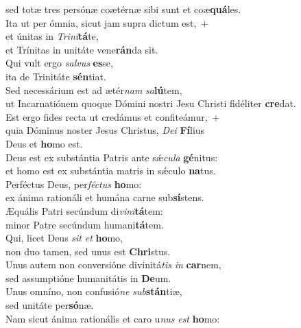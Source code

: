 \evenverse sed totæ tres persónæ coætérnæ sibi sunt et coæ\textbf{quá}les.\\
\oddverse Ita ut per ómnia, sicut jam supra dictum est,~+\\
\oddverse  et únitas in \textit{Tri}\textit{ni}\textbf{tá}te,~\*\\
\oddverse et Trínitas in unitáte vene\textbf{rán}da sit.\\
\evenverse Qui vult ergo \textit{sal}\textit{vus} \textbf{es}se,~\*\\
\evenverse ita de Trinitáte \textbf{sén}tiat.\\
\oddverse Sed necessárium est ad ætér\textit{nam} \textit{sa}\textbf{lú}tem,~\*\\
\oddverse ut Incarnatiónem quoque Dómini nostri Jesu Christi fidéliter \textbf{cre}dat.\\
\evenverse Est ergo fides recta ut credámus et confiteámur,~+\\
\evenverse  quia Dóminus noster Jesus Christus, \textit{De}\textit{i} \textbf{Fí}lius~\*\\
\evenverse Deus et \textbf{ho}mo est.\\
\oddverse Deus est ex substántia Patris ante sǽ\textit{cu}\textit{la} \textbf{gé}nitus:~\*\\
\oddverse et homo est ex substántia matris in sǽculo \textbf{na}tus.\\
\evenverse Perféctus Deus, per\textit{fé}\textit{ctus} \textbf{ho}mo:~\*\\
\evenverse ex ánima rationáli et humána carne sub\textbf{sí}stens.\\
\oddverse Æquális Patri secúndum di\textit{vi}\textit{ni}\textbf{tá}tem:~\*\\
\oddverse minor Patre secúndum humani\textbf{tá}tem.\\
\evenverse Qui, licet Deus \textit{sit} \textit{et} \textbf{ho}mo,~\*\\
\evenverse non duo tamen, sed unus est \textbf{Chri}stus.\\
\oddverse Unus autem non conversióne divinitá\textit{tis} \textit{in} \textbf{car}nem,~\*\\
\oddverse sed assumptióne humanitátis in \textbf{De}um.\\
\evenverse Unus omníno, non confusió\textit{ne} \textit{sub}\textbf{stán}tiæ,~\*\\
\evenverse sed unitáte per\textbf{só}næ.\\
\oddverse Nam sicut ánima rationális et caro u\textit{nus} \textit{est} \textbf{ho}mo:~\*\\

